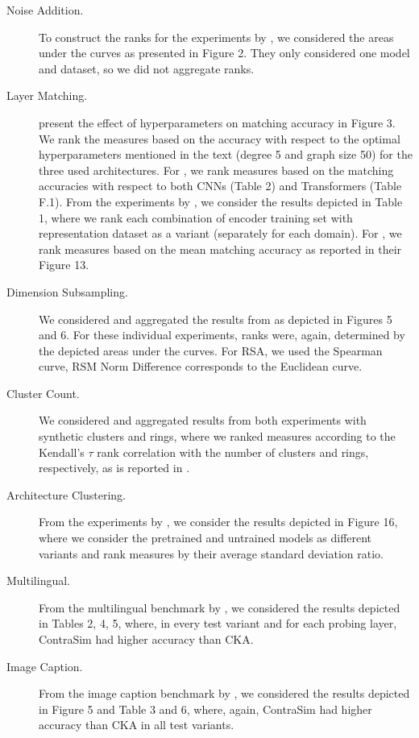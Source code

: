 \documentclass{article}
\newcommand{\citet}{\textcite}
\begin{document}
\begin{refsegment}
\begin{description}
%
    \item[Noise Addition.] To construct the ranks for the experiments by \citet{morcos_insights_2018}, we considered the areas under the curves as presented in Figure 2. They only considered one model and dataset, so we did not aggregate ranks.
%
    \item[Layer Matching.] \citet{chen_graph-based_2021} present the effect of hyperparameters on matching accuracy in Figure 3. We rank the measures based on the accuracy with respect to the optimal hyperparameters mentioned in the text (degree 5 and graph size 50) for the three used architectures.
    For \citet{kornblith_similarity_2019}, we rank measures based on the matching accuracies with respect to both CNNs (Table 2) and Transformers (Table F.1).
    From the experiments by \citet{rahamim_contrasim_2024}, we consider the results depicted in Table 1, where we
    rank each combination of encoder training set with representation dataset as a variant (separately for each domain).
    For \citet{shahbazi_using_2021}, we rank measures based on the mean matching accuracy as reported in their Figure 13.
%
    \item[Dimension Subsampling.] We considered and aggregated the results from \citet{shahbazi_using_2021} as depicted in Figures 5 and 6. For these individual experiments, ranks were, again, determined by the depicted areas under the curves. For RSA, we used the Spearman curve, RSM Norm Difference corresponds to the Euclidean curve.
%
    \item[Cluster Count.] We considered and aggregated results from both experiments with synthetic clusters and rings, where we ranked measures according to the Kendall's $\tau$ rank correlation with the number of clusters and rings, respectively, as is reported in \cite[Section 3.1]{barannikov_representation_2022}.
%
    \item[Architecture Clustering.] From the experiments by \citet{boix-adsera_gulp_2022}, we consider the results depicted in Figure 16, where we consider the pretrained and untrained models as different variants and rank measures by their average standard deviation ratio.
%
    \item[Multilingual.] From the multilingual benchmark by \citet{rahamim_contrasim_2024}, we considered the results depicted in Tables 2, 4, 5, where, in every test variant and for each probing layer, ContraSim had higher accuracy than CKA.
%
    \item[Image Caption.] From the image caption benchmark by \citet{rahamim_contrasim_2024}, we considered the results depicted in Figure 5 and Table 3 and 6, where, again, ContraSim had higher accuracy than CKA in all test variants.

\end{description}
\end{refsegment}
\end{document}
